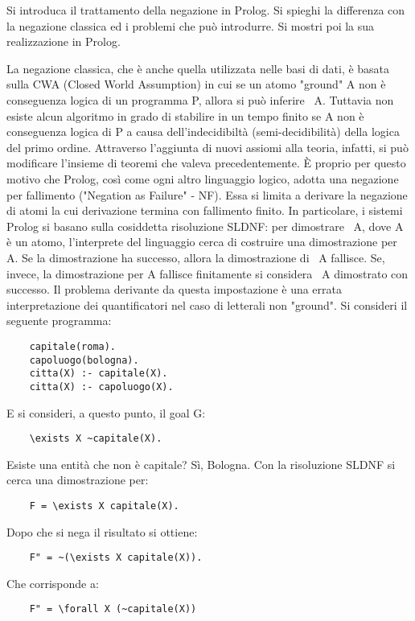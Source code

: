 \documentclass[answers, a4paper, 11pt]{exam}
\begin{document}
\begin{questions}
\question Si introduca il trattamento della negazione in Prolog. Si spieghi la differenza con la negazione
classica ed i problemi che può introdurre. Si mostri poi la sua realizzazione in Prolog.
\begin{solution}
  La negazione classica, che è anche quella utilizzata nelle basi di dati, è basata sulla CWA (Closed World Assumption) in cui se un atomo "ground" A non è conseguenza logica di un programma P, allora si può inferire ~A.
  Tuttavia non esiste alcun algoritmo in grado di stabilire in un tempo finito se A non è conseguenza logica di P a causa dell'indecidibiltà (semi-decidibilità) della logica del primo ordine. Attraverso l'aggiunta di nuovi assiomi alla teoria, infatti, si può modificare l'insieme di teoremi che valeva precedentemente.
  È proprio per questo motivo che Prolog, così come ogni altro linguaggio logico, adotta una negazione per fallimento ("Negation as Failure" - NF). Essa si limita a derivare la negazione di atomi la cui derivazione termina con fallimento finito.
  In particolare, i sistemi Prolog si basano sulla cosiddetta risoluzione SLDNF: per dimostrare ~A, dove A è un atomo, l'interprete del linguaggio cerca di costruire una dimostrazione per A.
  Se la dimostrazione ha successo, allora la dimostrazione di ~A fallisce. Se, invece, la dimostrazione per A fallisce finitamente si considera ~A dimostrato con successo.
  Il problema derivante da questa impostazione è una errata interpretazione dei quantificatori nel caso di letterali non "ground".
  Si consideri il seguente programma:
  \begin{verbatim}
    capitale(roma).
    capoluogo(bologna).
    citta(X) :- capitale(X).
    citta(X) :- capoluogo(X).
  \end{verbatim}
  E si consideri, a questo punto, il goal G:
  \begin{verbatim}
    \exists X ~capitale(X).
  \end{verbatim}
  Esiste una entità che non è capitale? Sì, Bologna.
  Con la risoluzione SLDNF si cerca una dimostrazione per:
  \begin{verbatim}
    F = \exists X capitale(X).
  \end{verbatim}
  Dopo che si nega il risultato si ottiene:
  \begin{verbatim}
    F" = ~(\exists X capitale(X)).
  \end{verbatim}
  Che corrisponde a:
  \begin{verbatim}
    F" = \forall X (~capitale(X))
  \end{verbatim}

\end{solution}
\end{questions}
\end{document}
